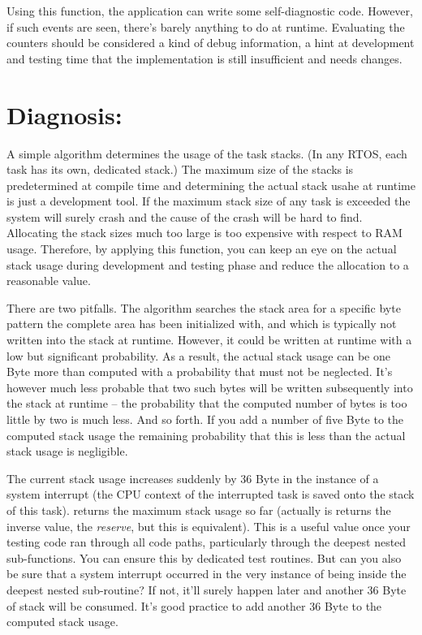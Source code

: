 Using this function, the application can write some self-diagnostic code.
However, if such events are seen, there's barely anything to do at
runtime. Evaluating the counters should be considered a kind of debug
information, a hint at development and testing time that the
implementation is still insufficient and needs changes.


\section{Diagnosis: }

A simple algorithm determines the usage of the task stacks. (In any RTOS,
each task has its own, dedicated stack.) The maximum size of the stacks is
predetermined at compile time and determining the actual stack usahe at
runtime is just a development tool. If the maximum stack size of any task
is exceeded the system will surely crash and the cause of the crash will
be hard to find. Allocating the stack sizes much too large is too
expensive with respect to RAM usage. Therefore, by applying this function,
you can keep an eye on the actual stack usage during development and
testing phase and reduce the allocation to a reasonable value.

There are two pitfalls. The algorithm searches the stack area for a
specific byte pattern the complete area has been initialized with, and
which is typically not written into the stack at runtime. However, it
could be written at runtime with a low but significant probability. As a
result, the actual stack usage can be one Byte more than computed with a
probability that must not be neglected. It's however much less probable
that two such bytes will be written subsequently into the stack at runtime
-- the probability that the computed number of bytes is too little by two
is much less. And so forth. If you add a number of five Byte to the
computed stack usage the remaining probability that this is less than the
actual stack usage is negligible.

The current stack usage increases suddenly by 36 Byte in the instance of a
system interrupt (the CPU context of the interrupted task is saved onto
the stack of this task).  returns the maximum
stack usage so far (actually is returns the inverse value, the
\emph{reserve}, but this is equivalent). This is a useful value once your
testing code ran through all code paths, particularly through the deepest
nested sub-functions. You can ensure this by dedicated test routines. But
can you also be sure that a system interrupt occurred in the very instance
of being inside the deepest nested sub-routine? If not, it'll surely
happen later and another 36 Byte of stack will be consumed. It's good
practice to add another 36 Byte to the computed stack usage.

